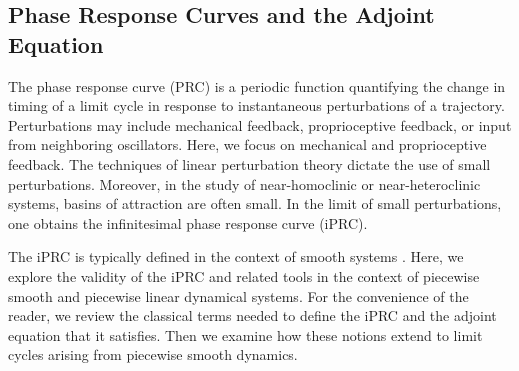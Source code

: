\documentclass[12pt]{article}
\begin{document}


%  



 
\subsection{Phase Response Curves and the Adjoint Equation}\label{sec:prc_and_adjoint}
The phase response curve (PRC) is a periodic function quantifying the change in timing of a limit cycle in response to  instantaneous perturbations of a trajectory.  Perturbations may include mechanical feedback, proprioceptive feedback, or input from neighboring oscillators.  Here, we focus on mechanical and proprioceptive feedback.  The techniques of linear perturbation theory dictate the use of small perturbations.  Moreover, in the study of near-homoclinic or near-heteroclinic systems, basins of attraction are often small. In the limit of small perturbations, one obtains the infinitesimal phase response curve (iPRC).

The iPRC is typically defined in the context of smooth systems \cite{ErmentroutTerman2010book}.  Here, we explore the validity of the iPRC and related tools in the context of piecewise smooth and piecewise linear dynamical systems.  For the convenience of the reader, we review the classical terms needed to define the iPRC and the adjoint equation that it satisfies.  Then we examine how these notions extend to limit cycles arising from piecewise smooth dynamics.
\end{document}
